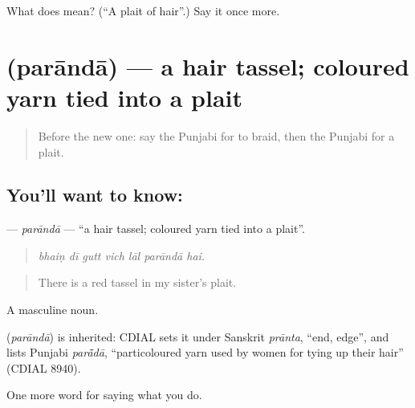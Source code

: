 \begin{tcolorbox}[breakable,colback=teal!4,colframe=teal!35!black,title={Before you move on}]
What does  mean? (\textquotedblleft{}A plait of hair\textquotedblright{}.) Say it once more.
\end{tcolorbox}
\section[\texorpdfstring{\pa{ਪਰਾਂਦਾ} (parāndā)}{ਪਰਾਂਦਾ (parāndā)}]{ (parāndā) — a hair tassel; coloured yarn tied into a plait}

\label{lesson:PA-C231-paranda}



\begin{quote}
Before the new one: say the Punjabi for to braid, then the Punjabi for a plait.
\end{quote}

\subsection*{You'll want to know: }
\textbf{} — \emph{parāndā} — \textquotedblleft{}a hair tassel; coloured yarn tied into a plait\textquotedblright{}.

\begin{quote}
      
\end{quote}

\begin{quote}
\emph{bhaiṇ dī gutt vich lāl parāndā hai.}
\end{quote}

\begin{quote}
There is a red tassel in my sister's plait.
\end{quote}

A masculine noun.

\begin{cousinweb}
\textbf{} (\emph{parāndā}) is inherited: CDIAL sets it under Sanskrit \emph{prānta}, \textquotedblleft{}end, edge\textquotedblright{}, and lists Punjabi \emph{parā̃dā}, \textquotedblleft{}particoloured yarn used by women for tying up their hair\textquotedblright{} (CDIAL 8940).
\end{cousinweb}

\begin{grammarlens}[title={What you've built}]
One more word for saying what you do.
\end{grammarlens}

